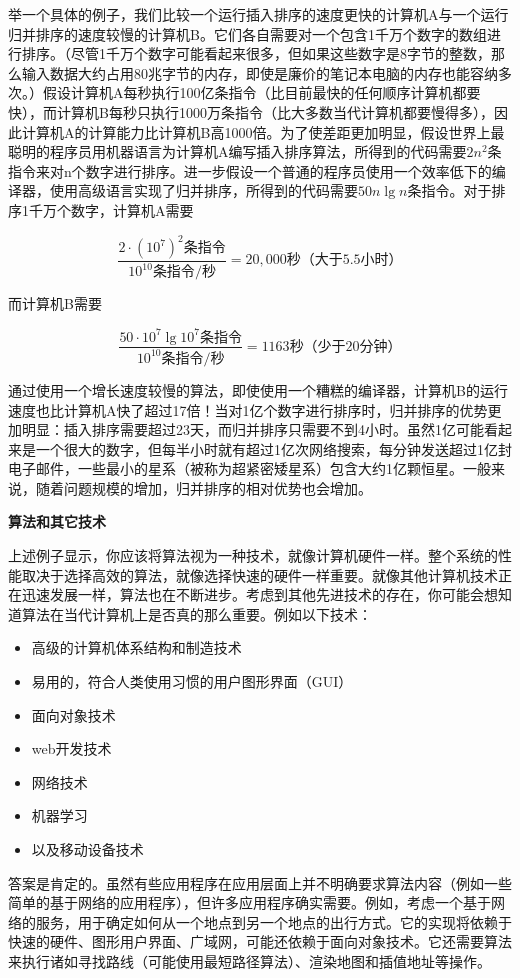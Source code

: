 \documentclass[lang=cn,newtx,10pt,scheme=chinese]{elegantbook}
\begin{document}
举一个具体的例子，我们比较一个运行插入排序的速度更快的计算机A与一个运行归并排序的速度较慢的计算机B。它们各自需要对一个包含1千万个数字的数组进行排序。（尽管1千万个数字可能看起来很多，但如果这些数字是8字节的整数，那么输入数据大约占用80兆字节的内存，即使是廉价的笔记本电脑的内存也能容纳多次。）假设计算机A每秒执行100亿条指令（比目前最快的任何顺序计算机都要快），而计算机B每秒只执行1000万条指令（比大多数当代计算机都要慢得多），因此计算机A的计算能力比计算机B高1000倍。为了使差距更加明显，假设世界上最聪明的程序员用机器语言为计算机A编写插入排序算法，所得到的代码需要$2n^2$条指令来对n个数字进行排序。进一步假设一个普通的程序员使用一个效率低下的编译器，使用高级语言实现了归并排序，所得到的代码需要$50n\lg n$条指令。对于排序1千万个数字，计算机A需要

$$
\frac{2\cdot (10^7)^2\text{条指令}}{10^{10}\text{条指令}/\text{秒}}
=
20,000\text{秒（大于5.5小时）}
$$

而计算机B需要

$$
\frac{50\cdot 10^7\lg 10^7\text{条指令}}{10^{10}\text{条指令}/\text{秒}}
=
1163\text{秒（少于20分钟）}
$$

通过使用一个增长速度较慢的算法，即使使用一个糟糕的编译器，计算机B的运行速度也比计算机A快了超过17倍！当对1亿个数字进行排序时，归并排序的优势更加明显：插入排序需要超过23天，而归并排序只需要不到4小时。虽然1亿可能看起来是一个很大的数字，但每半小时就有超过1亿次网络搜索，每分钟发送超过1亿封电子邮件，一些最小的星系（被称为超紧密矮星系）包含大约1亿颗恒星。一般来说，随着问题规模的增加，归并排序的相对优势也会增加。

\textbf{算法和其它技术}

上述例子显示，你应该将算法视为一种技术，就像计算机硬件一样。整个系统的性能取决于选择高效的算法，就像选择快速的硬件一样重要。就像其他计算机技术正在迅速发展一样，算法也在不断进步。考虑到其他先进技术的存在，你可能会想知道算法在当代计算机上是否真的那么重要。例如以下技术：

\begin{itemize}
    \item 高级的计算机体系结构和制造技术
    \item 易用的，符合人类使用习惯的用户图形界面（GUI）
    \item 面向对象技术
    \item web开发技术
    \item 网络技术
    \item 机器学习
    \item 以及移动设备技术
\end{itemize}

答案是肯定的。虽然有些应用程序在应用层面上并不明确要求算法内容（例如一些简单的基于网络的应用程序），但许多应用程序确实需要。例如，考虑一个基于网络的服务，用于确定如何从一个地点到另一个地点的出行方式。它的实现将依赖于快速的硬件、图形用户界面、广域网，可能还依赖于面向对象技术。它还需要算法来执行诸如寻找路线（可能使用最短路径算法）、渲染地图和插值地址等操作。
\end{document}
